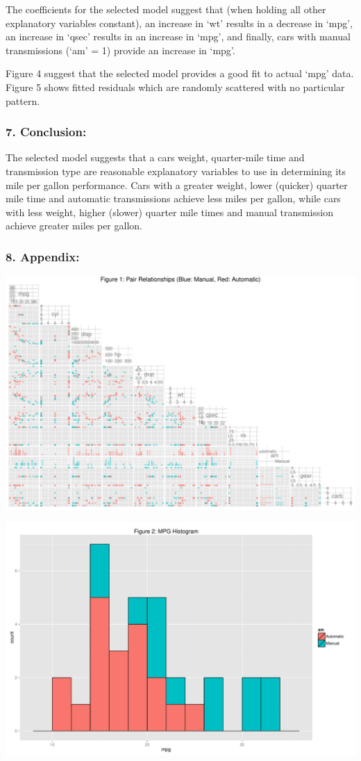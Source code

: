 \documentclass[]{article}
\begin{document}
The coefficients for the selected model suggest that (when holding all
other explanatory variables constant), an increase in `wt' results in a
decrease in `mpg', an increase in `qsec' results in an increase in
`mpg', and finally, cars with manual transmissions (`am' = 1) provide an
increase in `mpg'.

Figure 4 suggest that the selected model provides a good fit to actual
`mpg' data. Figure 5 shows fitted residuals which are randomly scattered
with no particular pattern.

\subsubsection{7. Conclusion:}\label{conclusion}

The selected model suggests that a cars weight, quarter-mile time and
transmission type are reasonable explanatory variables to use in
determining its mile per gallon performance. Cars with a greater weight,
lower (quicker) quarter mile time and automatic transmissions achieve
less miles per gallon, while cars with less weight, higher (slower)
quarter mile times and manual transmission achieve greater miles per
gallon.

\subsubsection{8. Appendix:}\label{appendix}

\includegraphics{figure/unnamed-chunk-10-1.pdf}

\includegraphics{figure/unnamed-chunk-11-1.pdf}
\end{document}

